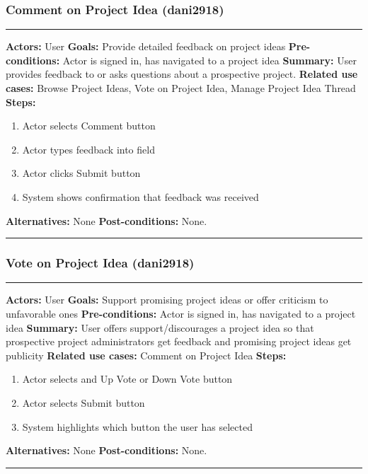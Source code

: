 \documentclass[11pt]{report}
\begin{document}
\subsubsection{Comment on Project Idea (dani2918)}
\vspace{2pt}
\hrule
\vspace{8pt}
 \textbf{Actors:} User \newline
\textbf{Goals:} Provide detailed feedback on project ideas  \newline
 \textbf{Pre-conditions:} Actor is signed in, has navigated to a project idea  \newline
 \textbf{Summary:}  User provides feedback to or asks questions about a prospective project. \newline
\textbf{Related use cases:} Browse Project Ideas, Vote on Project Idea, Manage Project Idea Thread \newline
\textbf{Steps:} \begin{enumerate}
  \item Actor selects Comment button
  \item Actor types feedback into field
  \item Actor clicks Submit button
  \item System shows confirmation that feedback was received
 \end{enumerate}
 \textbf{Alternatives:} None \newline
 \textbf{Post-conditions:} None. \newline
\vspace{8pt}
\hrule
\newpage

\subsubsection{Vote on Project Idea (dani2918)}
\vspace{2pt}
\hrule
\vspace{8pt}
 \textbf{Actors:} User \newline
\textbf{Goals:} Support promising project ideas or offer criticism to unfavorable ones  \newline
 \textbf{Pre-conditions:} Actor is signed in, has navigated to a project idea  \newline
 \textbf{Summary:}  User offers support/discourages a project idea so that prospective project administrators get feedback and promising project ideas get publicity \newline
\textbf{Related use cases:} Comment on Project Idea \newline
\textbf{Steps:} \begin{enumerate}
  \item Actor selects and Up Vote or Down Vote button
  \item Actor selects Submit button
  \item System highlights which button the user has selected
 \end{enumerate}
 \textbf{Alternatives:} None \newline
 \textbf{Post-conditions:} None. \newline
\vspace{8pt}
\hrule
\newpage
\end{document}
